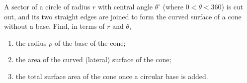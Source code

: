 A sector of a circle of radius $r$ with central angle $\theta^\circ$ (where $0<\theta<360$) is cut out, and its two straight edges are joined to form the curved surface of a cone without a base. Find, in terms of $r$ and $\theta$,
\begin{enumerate}
\item[(a)] the radius $\rho$ of the base of the cone;
\item[(b)] the area of the curved (lateral) surface of the cone;
\item[(c)] the total surface area of the cone once a circular base is added.
\end{enumerate}

